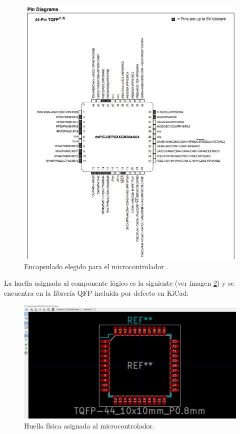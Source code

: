 \begin{figure}[H]
\centering 
\includegraphics[width=0.9\linewidth]{pictures/TQFP.PNG}
\caption{Encapsulado elegido para el microcontrolador \cite{DsPIC33EP512GM60416BitMicrocontrollers}.}
\label{fig:TQFP}
\end{figure}

La huella asignada al componente lógico es la siguiente (ver imagen \ref{fig:Huella_Pic}) y se encuentra en la librería QFP incluida por defecto en KiCad:

\begin{figure}[H]
\centering 
\includegraphics[width=0.9\linewidth]{pictures/HuellaPic.PNG}
\caption{Huella física asignada al microcontrolador.}
\label{fig:Huella_Pic}
\end{figure}

